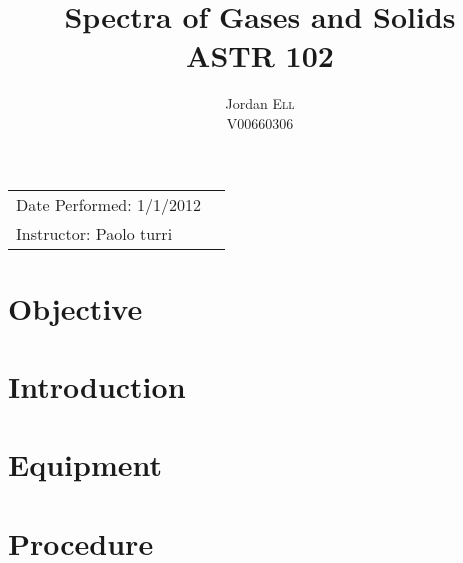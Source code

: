 \documentclass{article}
\title{Spectra of Gases and Solids \\ ASTR 102} %
\author{Jordan \textsc{Ell} \\ V00660306} %
\begin{document}
\maketitle %

\begin{tabular}{lr}
Date Performed: 1/1/2012\\ %
Instructor: Paolo turri %
\end{tabular}

\setlength\parindent{0pt} %

\renewcommand{\labelenumi}{\alph{enumi}.} %


\section{Objective}


 

\section{Introduction}



\section{Equipment}



\section{Procedure}
\end{document}
